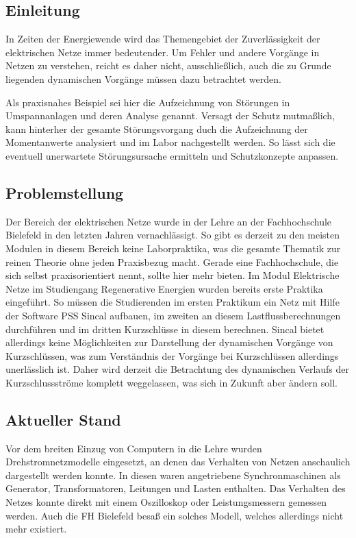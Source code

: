 \documentclass{scrartcl}
\begin{document}
	\newpage
	\setcounter{page}{1}
\begin{onehalfspace}

\section{Einleitung}
In Zeiten der Energiewende wird das Themengebiet der Zuverlässigkeit der elektrischen Netze immer bedeutender. Um Fehler und andere Vorgänge in Netzen zu verstehen, reicht es daher nicht, ausschließlich, auch die zu Grunde liegenden dynamischen Vorgänge müssen dazu betrachtet werden.

Als praxisnahes Beispiel sei hier die Aufzeichnung von Störungen in Umspannanlagen und deren Analyse genannt. Versagt der Schutz mutmaßlich, kann hinterher der gesamte Störungsvorgang duch die Aufzeichnung der Momentanwerte analysiert und im Labor nachgestellt werden. So lässt sich die eventuell unerwartete Störungsursache ermitteln und Schutzkonzepte anpassen.

\subsection{Problemstellung}
Der Bereich der elektrischen Netze wurde in der Lehre an der Fachhochschule Bielefeld in den letzten Jahren vernachlässigt. So gibt es derzeit zu den meisten Modulen in diesem Bereich keine Laborpraktika, was die gesamte Thematik zur reinen Theorie ohne jeden Praxisbezug macht. Gerade eine Fachhochschule, die sich selbst praxisorientiert nennt, sollte hier mehr bieten. Im Modul \glqq Elektrische Netze\grqq{} im Studiengang Regenerative Energien wurden bereits erste Praktika eingeführt. So müssen die Studierenden im ersten Praktikum ein Netz mit Hilfe der Software PSS Sincal aufbauen, im zweiten an diesem Lastflussberechnungen durchführen und im dritten Kurzschlüsse in diesem berechnen. Sincal bietet allerdings keine Möglichkeiten zur Darstellung der dynamischen Vorgänge von Kurzschlüssen, was zum Verständnis der Vorgänge bei Kurzschlüssen allerdings unerlässlich ist. Daher wird derzeit die Betrachtung des dynamischen Verlaufs der Kurzschlussströme komplett weggelassen, was sich in Zukunft aber ändern soll.

\subsection{Aktueller Stand}
Vor dem breiten Einzug von Computern in die Lehre wurden Drehstromnetzmodelle eingesetzt, an denen das Verhalten von Netzen anschaulich dargestellt werden konnte. In diesen waren angetriebene Synchronmaschinen als Generator, Transformatoren, Leitungen und Lasten enthalten. Das Verhalten des Netzes konnte direkt mit einem Oszilloskop oder Leistungsmessern gemessen werden. Auch die FH Bielefeld besaß ein solches Modell, welches allerdings nicht mehr existiert.


\end{onehalfspace}
\end{document}
